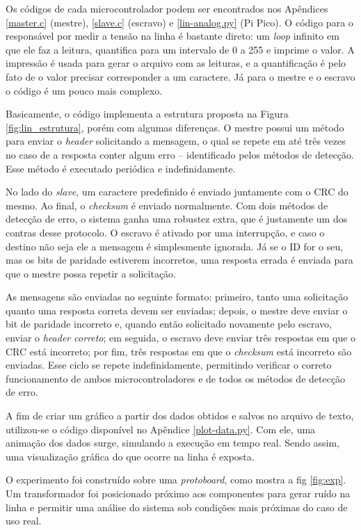 Os códigos de cada microcontrolador podem ser encontrados nos Apêndices \ref{master.c} (mestre), \ref{slave.c} (escravo) e \ref{lin-analog.py} (Pi Pico). O código para o responsável por medir a tensão na linha é bastante direto: um \textit{loop} infinito em que ele faz a leitura, quantifica para um intervalo de 0 a 255 e imprime o valor. A impressão é usada para gerar o arquivo com as leituras, e a quantificação é pelo fato de o valor precisar corresponder a um caractere. Já para o mestre e o escravo o código é um pouco mais complexo.

Basicamente, o código implementa a estrutura proposta na Figura \ref{fig:lin_estrutura}, porém com algumas diferenças. O mestre possui um método para enviar o \textit{header} solicitando a mensagem, o qual se repete em até três vezes no caso de a resposta conter algum erro -- identificado pelos métodos de detecção. Esse método é executado periódica e indefinidamente.

No lado do \textit{slave}, um caractere predefinido é enviado juntamente com o CRC do mesmo. Ao final, o \textit{checksum} é enviado normalmente. Com dois métodos de detecção de erro, o sistema ganha uma robustez extra, que é justamente um dos contras desse protocolo. O escravo é ativado por uma interrupção, e caso o destino não seja ele a mensagem é simplesmente ignorada. Já se o ID for o seu, mas os bits de paridade estiverem incorretos, uma resposta errada é enviada para que o mestre possa repetir a solicitação.

As mensagens são enviadas no seguinte formato: primeiro, tanto uma solicitação quanto uma resposta correta devem ser enviadas; depois, o mestre deve enviar o bit de paridade incorreto e, quando então solicitado novamente pelo escravo, enviar o \textit{header correto}; em seguida, o escravo deve enviar três respostas em que o CRC está incorreto; por fim, três respostas em que o \textit{checksum} está incorreto são enviadas. Esse ciclo se repete indefinidamente, permitindo verificar o correto funcionamento de ambos microcontroladores e de todos os métodos de detecção de erro.

A fim de criar um gráfico a partir dos dados obtidos e salvos no arquivo de texto, utilizou-se o código disponível no Apêndice \ref{plot-data.py}. Com ele, uma animação dos dados surge, simulando a execução em tempo real. Sendo assim, uma visualização gráfica do que ocorre na linha é exposta.

O experimento foi construído sobre uma \textit{protoboard}, como mostra a fig \ref{fig:exp}. Um transformador foi posicionado próximo aos componentes para gerar ruído na linha e permitir uma análise do sistema sob condições mais próximas do caso de uso real.

